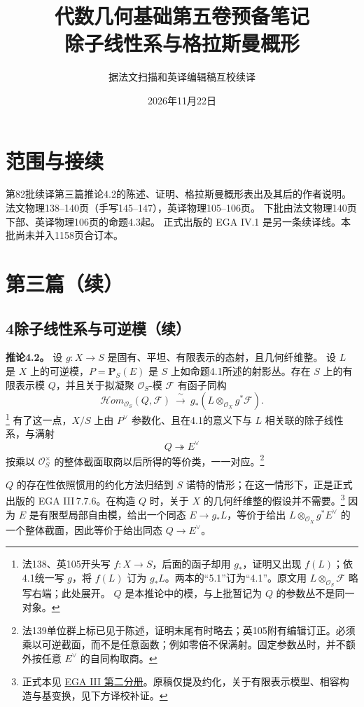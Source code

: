 \documentclass[openany,fontset=fandol]{ctexbook}
\newcommand{\OO}{\mathcal O}
\newcommand{\FF}{\mathcal F}
\newcommand{\HH}{\mathcal{H}\!om}
\newcommand{\PP}{\mathbf P}
\begin{document}
\title{代数几何基础第五卷预备笔记\\除子线性系与格拉斯曼概形}
\author{据法文扫描和英译编辑稿互校续译}
\date{2026年11月22日}
\maketitle

\chapter*{范围与接续}
第82批续译第三篇推论4.2的陈述、证明、格拉斯曼概形表出及其后的作者说明。
法文物理138--140页（手写145--147），英译物理105--106页。
下批由法文物理140页下部、英译物理106页的命题4.3起。
正式出版的 EGA IV.1 是另一条续译线。本批尚未并入1158页合订本。

\chapter*{第三篇（续）}
\section*{4\quad 除子线性系与可逆模（续）}

\noindent\textbf{推论4.2。}
设 \(g:X\to S\) 是固有、平坦、有限表示的态射，且几何纤维整。
设 \(L\) 是 \(X\) 上的可逆模，\(P=\PP_S(E)\) 是 \(S\) 上如命题4.1所述的射影丛。存在 \(S\) 上的有限表示模 \(Q\)，并且关于拟凝聚 \(\OO_S\)-模 \(\FF\) 有函子同构
\[
 \HH_{\OO_S}(Q,\FF)
 \ \xrightarrow{\ \sim\ }\
 g_*(L\otimes_{\OO_X}g^*\FF).
\]
\footnote{法138、英105开头写 \(f:X\to S\)，后面的函子却用 \(g_*\)，证明又出现 \(f(L)\)；依4.1统一写 \(g\)，将 \(f(L)\) 订为 \(g_*L\)。两本的“5.1”订为“4.1”。原文用 \(L\otimes_{\OO_S}\FF\) 略写右端；此处展开。 \(Q\) 是本推论中的模，与上批暂记为 \(Q\) 的参数丛不是同一对象。}
有了这一点，\(X/S\) 上由 \(P^\vee\) 参数化、且在4.1的意义下与 \(L\) 相关联的除子线性系，与满射
\[
 Q\twoheadrightarrow E^\vee
\]
按乘以 \(\OO_S^\times\) 的整体截面取商以后所得的等价类，一一对应。\footnote{法139单位群上标已见于陈述，证明末尾有时略去；英105附有编辑订正。必须乘以可逆截面，而不是任意函数；例如零倍不保满射。固定参数丛时，并不额外按任意 \(E^\vee\) 的自同构取商。}

\medskip
\(Q\) 的存在性依照惯用的约化方法归结到 \(S\) 诺特的情形；在这一情形下，正是正式出版的 EGA III\,7.7.6。在构造 \(Q\) 时，关于 \(X\) 的几何纤维整的假设并不需要。\footnote{正式本见 \href{https://www.numdam.org/item/PMIHES_1963__17__5_0/}{EGA III 第二分册}。原稿仅提及约化，关于有限表示模型、相容构造与基变换，见下方译校补证。}
因为 \(E\) 是有限型局部自由模，给出一个同态 \(E\to g_*L\)，等价于给出 \(L\otimes_{\OO_X}g^*E^\vee\) 的一个整体截面，因此等价于给出同态 \(Q\to E^\vee\)。
\end{document}
